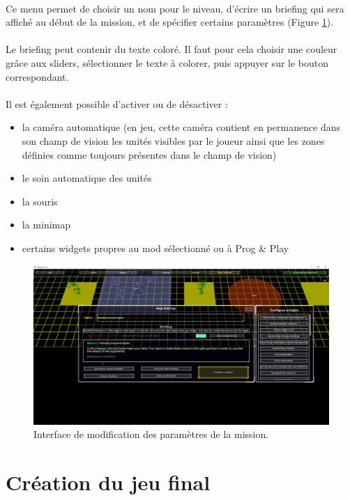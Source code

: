 \documentclass[a4paper]{article}
\begin{document}
\paragraph{ }
Ce menu permet de choisir un nom pour le niveau, d'écrire un briefing qui sera affiché au début de la mission, et de spécifier certains paramètres (Figure \ref{fig:editor-mapsettings}).
\paragraph{ }
Le briefing peut contenir du texte coloré. Il faut pour cela choisir une couleur grâce aux sliders, sélectionner le texte à colorer, puis appuyer sur le bouton correspondant.
\paragraph{ }
Il est également possible d'activer ou de désactiver :
\begin{itemize}
\item la caméra automatique (en jeu, cette caméra contient en permanence dans son champ de vision les unités visibles par le joueur ainsi que les zones définies comme toujours présentes dans le champ de vision)
\item le soin automatique des unités
\item la souris
\item la minimap
\item certains widgets propres au mod sélectionné ou à Prog \& Play
\end{itemize}
\begin{figure}[H]
\centering
\includegraphics[width=\linewidth]{editor-mapsettings.png}
\caption{Interface de modification des paramètres de la mission.}
\label{fig:editor-mapsettings}
\end{figure}
\section{Création du jeu final}
\end{document}

